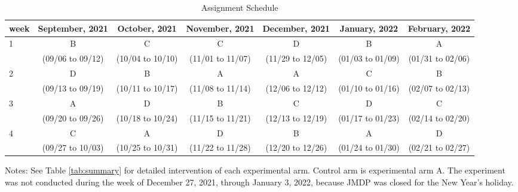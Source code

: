 \documentclass[12pt, a4paper]{article}
\begin{document}
\begin{table}[H]

\caption{\label{tab:assignment}Assignment Schedule}
\centering
\fontsize{9}{11}\selectfont
\begin{threeparttable}
\begin{tabular}[t]{lcccccc}
\toprule
week & September, 2021 & October, 2021 & November, 2021 & December, 2021 & January, 2022 & February, 2022\\
\midrule
1 & B & C & C & D & B & A\\
 & (09/06 to 09/12) & (10/04 to 10/10) & (11/01 to 11/07) & (11/29 to 12/05) & (01/03 to 01/09) & (01/31 to 02/06)\\
2 & D & B & A & A & C & B\\
 & (09/13 to 09/19) & (10/11 to 10/17) & (11/08 to 11/14) & (12/06 to 12/12) & (01/10 to 01/16) & (02/07 to 02/13)\\
3 & A & D & B & C & D & C\\
 & (09/20 to 09/26) & (10/18 to 10/24) & (11/15 to 11/21) & (12/13 to 12/19) & (01/17 to 01/23) & (02/14 to 02/20)\\
4 & C & A & D & B & A & D\\
 & (09/27 to 10/03) & (10/25 to 10/31) & (11/22 to 11/28) & (12/20 to 12/26) & (01/24 to 01/30) & (02/21 to 02/27)\\
\bottomrule
\end{tabular}
\begin{tablenotes}
\item Notes: See Table \ref{tab:summary} for detailed intervention of each experimental arm. Control arm is experimental arm A. The experiment was not conducted during the week of December 27, 2021, through January 3, 2022, because JMDP was closed for the New Year's holiday.
\end{tablenotes}
\end{threeparttable}
\end{table}
\end{document}
